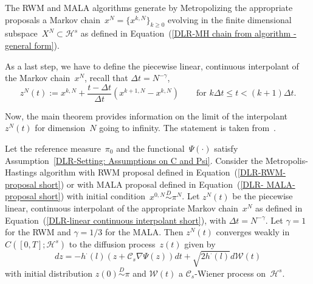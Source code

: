 The RWM and MALA algorithms generate by Metropolizing the appropriate proposals a Markov chain~$x^{N} = \{ x^{k,N} \}_{k \geq 0}$ evolving in the finite dimensional subspace~$X^{N} \subset \mathcal{H}^s$ as defined in Equation~(\ref{DLR-MH chain from algorithm - general form}). 

As a last step, we have to define the piecewise linear, continuous interpolant of the Markov chain~$x^N$, recall that $\Delta t = N^{-\gamma}$,
\begin{equation}
 \label{DLR-linear continuous interpolant short}
 z^N (t) := x^{k,N} + \frac{t - \Delta t}{\Delta t} (x^{k+1,N} - x^{k,N}) \qquad \text{for } k \Delta t \leq t < ( k + 1) \Delta t.
\end{equation}

Now, the main theorem provides information on the limit of the interpolant~$z^N(t)$ for dimension~$N$ going to infinity. The statement is taken from~\autocite[Main Theorem, Theorem 2.6]{Mattingly2010, Pillai2012}.
\begin{thm}
 \label{DLR-THM main theorem}
 Let the reference measure~$\pi_0$ and the functional~$\Psi(\cdot)$ satisfy Assumption~\ref{DLR-Setting: Assumptions on C and Psi}. Consider the Metropolis-Hastings algorithm with RWM proposal defined in Equation~(\ref{DLR-RWM-proposal short}) or with MALA proposal defined in Equation~(\ref{DLR- MALA-proposal short}) with initial condition~$x^{0,N} \stackrel{D}{\sim} \pi^N$. Let $z^N(t)$ be the piecewise linear, continuous interpolant of the appropriate Markov chain~$x^N$ as defined in Equation~(\ref{DLR-linear continuous interpolant short}), with $\Delta t = N^{- \gamma}$. Let $\gamma=1$ for the RWM and $\gamma=1/3$ for the MALA. Then $z^N(t)$ converges weakly in $C([0,T];\mathcal{H}^s)$ to the diffusion process~$z(t)$ given by
 \begin{equation}
 \label{DLR-Thm diffusion process}
  dz = -h^{\cdot}(l) (z + \mathcal{C}_s \nabla \Psi(z)) dt + \sqrt{2 h^{\cdot}(l)} d\mathcal{W}(t)
 \end{equation}
with initial distribution $z(0)\stackrel{D}{\sim} \pi$ and $\mathcal{W}(t)$ a $\mathcal{C}_s$-Wiener process on~$\mathcal{H}^s$.
\end{thm}


